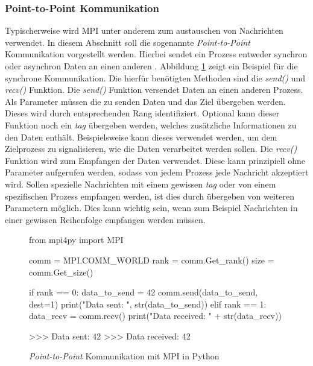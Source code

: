 \subsubsection{Point-to-Point Kommunikation}
Typischerweise wird \ac{MPI} unter anderem zum austauschen von Nachrichten verwendet. In diesem Abschnitt soll die sogenannte \emph{Point-to-Point} Kommunikation vorgestellt werden. Hierbei sendet ein Prozess entweder synchron oder asynchron Daten an einen anderen \cite{nielsen2016introduction}. Abbildung \ref{fix:example_point_to_point} zeigt ein Beispiel für die synchrone Kommunikation. Die hierfür benötigten Methoden sind die \emph{send()} und \emph{recv()} Funktion. Die \emph{send()} Funktion versendet Daten an einen anderen Prozess. Als Parameter müssen die zu senden Daten und das Ziel übergeben werden. Dieses wird durch entsprechenden Rang identifiziert. Optional kann dieser Funktion noch ein \emph{tag} übergeben werden, welches zusätzliche Informationen zu den Daten enthält. Beispielsweise kann dieses verwendet werden, um dem Zielprozess zu signalisieren, wie die Daten verarbeitet werden sollen. Die \emph{recv()} Funktion wird zum Empfangen der Daten verwendet. Diese kann prinzipiell ohne Parameter aufgerufen werden, sodass von jedem Prozess jede Nachricht akzeptiert wird. Sollen spezielle Nachrichten mit einem gewissen \emph{tag} oder von einem spezifischen Prozess empfangen werden, ist dies durch übergeben von weiteren Parametern möglich. Dies kann wichtig sein, wenn zum Beispiel Nachrichten in einer gewissen Reihenfolge empfangen werden müssen. 
\begin{figure}
	\begin{python}
		from mpi4py import MPI
		
		comm = MPI.COMM_WORLD
		rank = comm.Get_rank()
		size = comm.Get_size()
		
		if rank == 0:
			data_to_send = 42
			comm.send(data_to_send, dest=1)
			print("Data sent: ", str(data_to_send))
		elif rank == 1:
			data_recv = comm.recv()
			print("Data received: " + str(data_recv))
			
		>>> Data sent:  42
		>>> Data received: 42
	\end{python}
	\label{fix:example_point_to_point}
	\caption{\emph{Point-to-Point} Kommunikation mit \ac{MPI} in Python}
\end{figure}
\\\\
